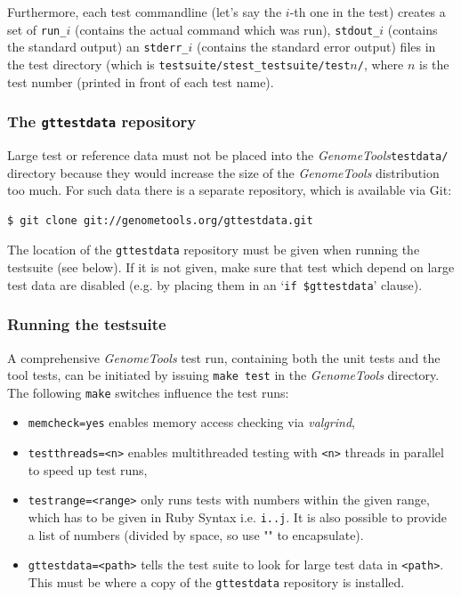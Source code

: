 \documentclass[11pt,final]{article}
\newcommand{\keyword}[1]{\lstinline{#1}}
\newcommand{\Gt}[0]{\emph{GenomeTools}\xspace}
\begin{document}
Furthermore, each test commandline (let's say the $i$-th one in the test)
creates a set of \keyword{run_}$i$ (contains the actual command which was run),
\keyword{stdout_}$i$ (contains the standard output) an \keyword{stderr_}$i$
(contains the standard error output) files in the test directory (which is
\keyword{testsuite/stest_testsuite/test}$n$\keyword{/}, where $n$ is the test
number (printed in front of each test name).

\subsubsection{The \keyword{gttestdata} repository}
\label{gttestdata}

Large test or reference data must not be placed into the \Gt \keyword{testdata/}
directory because they would increase the size of the \Gt distribution too much.
For such data there is a separate repository, which is available via Git:

\begin{lstlisting}[language=sh]
$ git clone git://genometools.org/gttestdata.git
\end{lstlisting}%

The location of the \keyword{gttestdata} repository must be given when running
the testsuite (see below). If it is not given, make sure that test which depend
on large test data are disabled (e.g. by placing them in an
`\keyword{if $gttestdata}' clause).%

\subsubsection{Running the testsuite}
A comprehensive \Gt test run, containing both the unit tests and the tool tests,
can be initiated by issuing \keyword{make test} in the \Gt directory.
The following \keyword{make} switches influence the test runs:
\begin{itemize}
\item
\keyword{memcheck=yes} enables memory access checking via \emph{valgrind},
\item
\keyword{testthreads=<n>} enables multithreaded testing with \keyword{<n>}
threads in parallel to speed up test runs,
\item
\keyword{testrange=<range>} only runs tests with numbers within the given range,
which has to be given in Ruby Syntax i.e. \keyword{i..j}. It is also possible to
provide a list of numbers (divided by space, so use "" to encapsulate).
\item
\keyword{gttestdata=<path>} tells the test suite to look for large test data in
\keyword{<path>}. This must be where a copy of the \keyword{gttestdata}
repository is installed.

\end{itemize}
\end{document}
